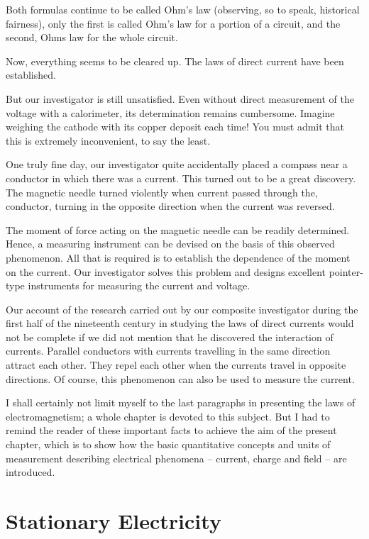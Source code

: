 Both formulas continue to be called Ohm's law (observing, so to speak, historical fairness), only the first is called Ohm's law for a portion of a circuit, and the second, Ohms law for the  whole circuit.

Now, everything seems to be cleared up. The laws of direct current have been established.

But our investigator is still unsatisfied. Even without direct measurement of the voltage with a calorimeter, its determination remains cumbersome. Imagine weighing the cathode with its copper deposit each time! You must admit that this is extremely inconvenient, to say the least.

One truly fine day, our investigator quite accidentally placed a compass near a conductor in which there was a current. This turned out to be a great discovery. The magnetic needle turned violently when current passed through the, conductor, turning in the opposite direction when the current was reversed.

The moment of force acting on the magnetic needle can be readily determined. Hence, a measuring instrument can be devised on the basis of this observed phenomenon. All that is required is to establish the dependence of the moment on the current. Our investigator solves this problem and designs excellent pointer-type instruments for measuring the current and voltage.

Our account of the research carried out by our composite investigator during the first half of the nineteenth century in studying the laws of direct currents would not be complete if we did not mention that he discovered the interaction of currents. Parallel conductors with currents travelling in the same direction attract each other. They repel each other when the currents travel in opposite directions. Of course, this phenomenon can also be used to measure the current.

I shall certainly not limit myself to the last paragraphs in presenting the laws of electromagnetism; a whole chapter is devoted to this subject. But I had to remind the reader of these important facts to achieve the aim of the present chapter, which is to show how the basic quantitative concepts and units of measurement describing electrical phenomena -- current, charge and field -- are introduced.

\section{Stationary Electricity}

